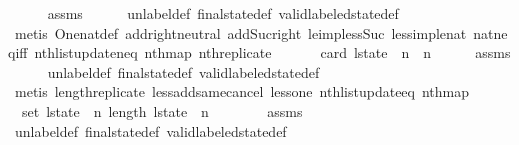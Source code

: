 \begin{isabellebody}
\ \ \ \ \isamarkupfalse%
\ assms\isanewline
\ \ \ \ \isamarkupfalse%
\ unlabel{\isacharunderscore}def\ final{\isacharunderscore}state{\isacharunderscore}def\ valid{\isacharunderscore}labeled{\isacharunderscore}state{\isacharunderscore}def\isanewline
\ \ \ \ \isamarkupfalse%
\ {\isacharparenleft}metis\ One{\isacharunderscore}nat{\isacharunderscore}def\ add{\isachardot}right{\isacharunderscore}neutral\ add{\isacharunderscore}Suc{\isacharunderscore}right\ le{\isacharunderscore}imp{\isacharunderscore}less{\isacharunderscore}Suc\ less{\isacharunderscore}imp{\isacharunderscore}le{\isacharunderscore}nat\ nat{\isacharunderscore}neq{\isacharunderscore}iff\ nth{\isacharunderscore}list{\isacharunderscore}update{\isacharunderscore}neq\ nth{\isacharunderscore}map\ nth{\isacharunderscore}replicate{\isacharparenright}\isanewline
\ \ \isamarkupfalse%
\isanewline
\ \ \isamarkupfalse%
\ {\isachardoublequoteopen}card\ {\isacharparenleft}l{\isacharunderscore}state\ {\isacharbang}\ n{\isacharparenright}\ {\isacharequal}\ n{\isachardoublequoteclose}\isanewline
\ \ \ \ \isamarkupfalse%
\ assms\isanewline
\ \ \ \ \isamarkupfalse%
\ unlabel{\isacharunderscore}def\ final{\isacharunderscore}state{\isacharunderscore}def\ valid{\isacharunderscore}labeled{\isacharunderscore}state{\isacharunderscore}def\isanewline
\ \ \ \ \isamarkupfalse%
\ {\isacharparenleft}metis\ length{\isacharunderscore}replicate\ less{\isacharunderscore}add{\isacharunderscore}same{\isacharunderscore}cancel{}\ less{\isacharunderscore}one\ nth{\isacharunderscore}list{\isacharunderscore}update{\isacharunderscore}eq\ nth{\isacharunderscore}map{\isacharparenright}\isanewline
\ \ \isamarkupfalse%
\isanewline
\ \ \isamarkupfalse%
\ {\isachardoublequoteopen}{\isasymUnion}\ {\isacharparenleft}set\ l{\isacharunderscore}state{\isacharparenright}\ {\isacharequal}\ {\isacharbraceleft}{}{\isachardot}{\isachardot}{\isacharless}n{\isacharbraceright}{\isachardoublequoteclose}\ {\isachardoublequoteopen}length\ l{\isacharunderscore}state\ {\isacharequal}\ n\ {\isacharplus}\ {}{\isachardoublequoteclose}\isanewline
\ \ \ \ \isamarkupfalse%
\ assms\isanewline
\ \ \ \ \isamarkupfalse%
\ unlabel{\isacharunderscore}def\ final{\isacharunderscore}state{\isacharunderscore}def\ valid{\isacharunderscore}labeled{\isacharunderscore}state{\isacharunderscore}def\isanewline
\ \ \ \ \isamarkupfalse%

\end{isabellebody}
